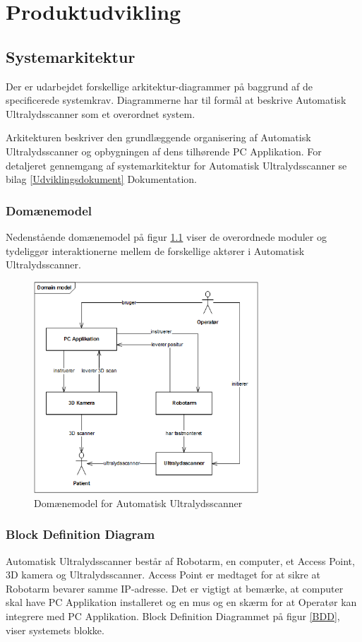 \chapter{Produktudvikling}\label{Produktudvikling} 

\section{Systemarkitektur}\label{Systemarkitektur}
Der er udarbejdet forskellige arkitektur-diagrammer på baggrund af de specificerede systemkrav. Diagrammerne har til formål at beskrive Automatisk Ultralydsscanner som et overordnet system.

Arkitekturen beskriver den grundlæggende organisering af Automatisk Ultralydsscanner og opbygningen af dens tilhørende PC Applikation. For detaljeret gennemgang af systemarkitektur for Automatisk Ultralydsscanner se bilag  \ref{Udviklingsdokument} Dokumentation.

\subsection{Domænemodel}
Nedenstående domænemodel på figur \ref{domain} viser de overordnede moduler og tydeliggør interaktionerne mellem de forskellige aktører i Automatisk Ultralydsscanner. 

\begin{figure}[H]
    \centering
    \includegraphics[width=0.75\textwidth]{figurer/d/Design/uml_domain}
    \caption{Domænemodel for Automatisk Ultralydsscanner}
    \label{domain}
\end{figure}

\subsection{Block Definition Diagram}
Automatisk Ultralydsscanner består af Robotarm, en computer, et Access Point, 3D kamera og Ultralydsscanner. Access Point er medtaget for at sikre at Robotarm bevarer samme IP-adresse. Det er vigtigt at bemærke, at computer skal have PC Applikation installeret og en mus og en skærm for at Operatør kan integrere med PC Applikation. Block Definition Diagrammet på figur \ref{BDD}, viser systemets blokke. 

